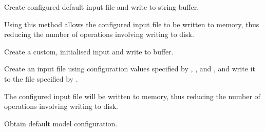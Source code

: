 \documentclass[letterpaper,10pt,english]{sphinxmanual}
\begin{document}
\begin{fulllineitems}
\begin{fulllineitems}
\end{fulllineitems}


\begin{fulllineitems}
\label{\detokenize{bcmdModel:bayescmd.bcmdModel.ModelBCMD.create_default_input}}
Create configured default input file and write to string buffer.

Using this method allows the configured input file to be written to
memory, thus reducing the number of operations involving writing to
disk.

\end{fulllineitems}


\begin{fulllineitems}
\label{\detokenize{bcmdModel:bayescmd.bcmdModel.ModelBCMD.create_initialised_input}}
Create a custom, initialised input and write to buffer.

Create an input file using configuration values specified by
{\hyperref[\detokenize{bcmdModel:bayescmd.bcmdModel.bcmd_model.ModelBCMD.inputs}]{}}, {\hyperref[\detokenize{bcmdModel:bayescmd.bcmdModel.bcmd_model.ModelBCMD.times}]{}}, {\hyperref[\detokenize{bcmdModel:bayescmd.bcmdModel.bcmd_model.ModelBCMD.params}]{}} and {\hyperref[\detokenize{bcmdModel:bayescmd.bcmdModel.bcmd_model.ModelBCMD.outputs}]{}}, and
write it to the file specified by {\hyperref[\detokenize{bcmdModel:bayescmd.bcmdModel.bcmd_model.ModelBCMD.input_file}]{}}.

The configured input file will be written to memory, thus reducing the
number of operations involving writing to disk.

\end{fulllineitems}


\begin{fulllineitems}
\label{\detokenize{bcmdModel:bayescmd.bcmdModel.ModelBCMD.get_defaults}}
Obtain default model configuration.


\end{fulllineitems}
\end{fulllineitems}
\end{document}
